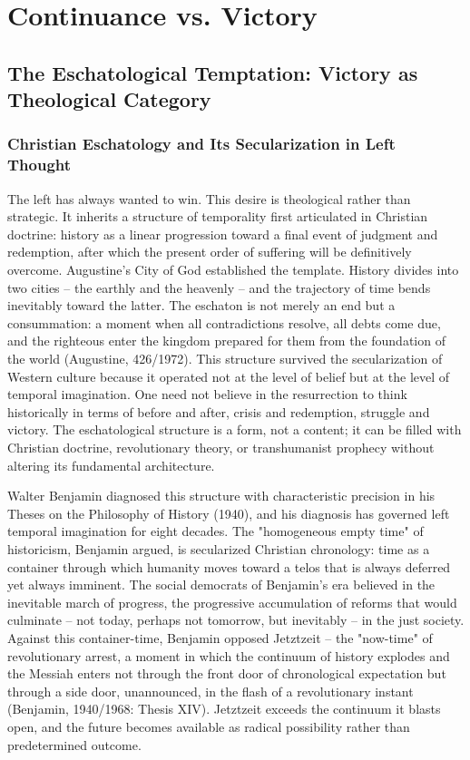 \chapter{Continuance vs. Victory}
\label{ch:05}

\section{The Eschatological Temptation: Victory as Theological Category}

\subsection{Christian Eschatology and Its Secularization in Left Thought}

The left has always wanted to win. This desire is theological rather than strategic. It inherits a structure of temporality first articulated in Christian doctrine: history as a linear progression toward a final event of judgment and redemption, after which the present order of suffering will be definitively overcome. Augustine's City of God established the template. History divides into two cities -- the earthly and the heavenly -- and the trajectory of time bends inevitably toward the latter. The eschaton is not merely an end but a consummation: a moment when all contradictions resolve, all debts come due, and the righteous enter the kingdom prepared for them from the foundation of the world (Augustine, 426/1972). This structure survived the secularization of Western culture because it operated not at the level of belief but at the level of temporal imagination. One need not believe in the resurrection to think historically in terms of before and after, crisis and redemption, struggle and victory. The eschatological structure is a form, not a content; it can be filled with Christian doctrine, revolutionary theory, or transhumanist prophecy without altering its fundamental architecture.

Walter Benjamin diagnosed this structure with characteristic precision in his Theses on the Philosophy of History (1940), and his diagnosis has governed left temporal imagination for eight decades. The "homogeneous empty time" of historicism, Benjamin argued, is secularized Christian chronology: time as a container through which humanity moves toward a telos that is always deferred yet always imminent. The social democrats of Benjamin's era believed in the inevitable march of progress, the progressive accumulation of reforms that would culminate -- not today, perhaps not tomorrow, but inevitably -- in the just society. Against this container-time, Benjamin opposed Jetztzeit -- the "now-time" of revolutionary arrest, a moment in which the continuum of history explodes and the Messiah enters not through the front door of chronological expectation but through a side door, unannounced, in the flash of a revolutionary instant (Benjamin, 1940/1968: Thesis XIV). Jetztzeit exceeds the continuum it blasts open, and the future becomes available as radical possibility rather than predetermined outcome.

